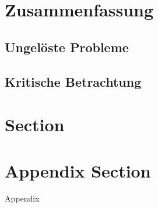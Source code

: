 \documentclass[a4paper, 12pt]{article}
\begin{document}
\section{Zusammenfassung}
\subsection{Ungelöste Probleme}
\subsection{Kritische Betrachtung}


\section{Section}

\begingroup
\setlength{\emergencystretch}{.5em}
\printbibliography
\endgroup

\appendix
\section{Appendix Section}
Appendix
\end{document}
